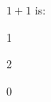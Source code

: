 \documentclass[a4paper]{article}
\begin{document}


\begin{question}{1}
    $1 + 1$ is:
    \begin{multiplechoice}
        \item 1
        \item 2
        \item 0
    \end{multiplechoice}
\end{question}
\end{document}
